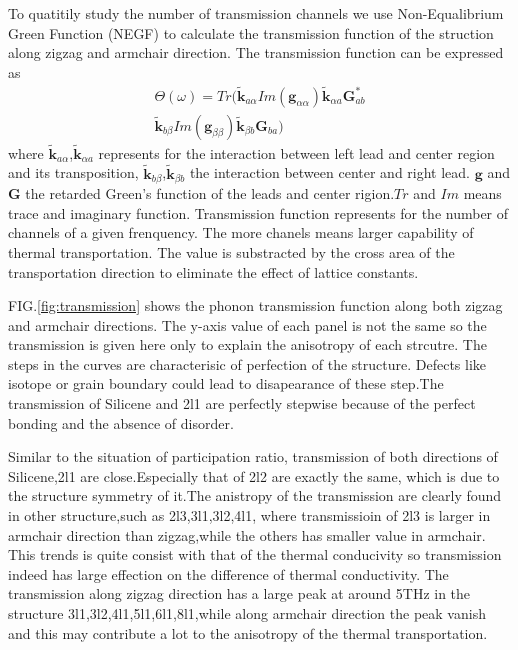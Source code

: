 \documentclass[%
 reprint,
 amsmath,amssymb,
 aps,
 prb,
]{revtex4-1}
\begin{document}
To quatitily study the number of transmission channels we use Non-Equalibrium Green Function (NEGF)\cite{Mingo2003} to calculate the transmission function of the struction along zigzag and armchair direction.
The transmission function can be expressed as
\begin{equation}
  \begin{split}
    \Theta(\omega)= Tr(
    \mathbf{\widetilde{k}}_{a\alpha}
    Im(\mathbf{g}_{\alpha\alpha})
    \mathbf{\widetilde{k}}_{\alpha a}
    \mathbf{G}_{a b}^*\\
    \mathbf{\widetilde{k}}_{b\beta}
    Im(\mathbf{g}_{\beta\beta})
    \mathbf{\widetilde{k}}_{\beta b}
    \mathbf{G}_{b a}
    )
  \end{split}
\end{equation}
where $\mathbf{\widetilde{k}}_{a\alpha}$,$\mathbf{\widetilde{k}}_{\alpha a}$ represents for the interaction between left lead and center region and its transposition,  $\mathbf{\widetilde{k}}_{b\beta}$,$\mathbf{\widetilde{k}}_{\beta b}$ the interaction between center and right lead. $\mathbf{g}$ and $\mathbf{G}$ the retarded Green's function of the leads and center rigion.$Tr$ and $Im$ means trace and imaginary function. Transmission function represents for the number of channels of a given frenquency. The more chanels means larger capability of thermal transportation. The value is substracted by the cross area of the transportation direction to eliminate the effect of lattice constants.

FIG.\ref{fig:transmission} shows the phonon transmission function along both zigzag and armchair directions. The y-axis value of each panel is not the same so the transmission is given here only to explain the anisotropy of each strcutre. The steps in the curves are  characterisic of perfection of the structure. Defects like isotope or grain boundary could lead to disapearance of these step.The transmission of Silicene and 2l1 are perfectly stepwise because of the perfect bonding and the absence of disorder.

Similar to the situation of participation ratio, transmission of both directions of Silicene,2l1 are close.Especially that of 2l2 are exactly the same, which is due to the structure symmetry of it.The anistropy of the transmission are clearly found in other structure,such as 2l3,3l1,3l2,4l1, where transmissioin of 2l3 is larger in armchair direction than zigzag,while the others has smaller value in armchair. This trends is quite consist with that of the thermal conducivity so transmission indeed has large effection on the difference of thermal conductivity. The transmission along zigzag direction has a large peak at around 5THz in the structure 3l1,3l2,4l1,5l1,6l1,8l1,while along armchair direction the peak vanish and this may contribute a lot to the anisotropy of the thermal transportation.
\end{document}
